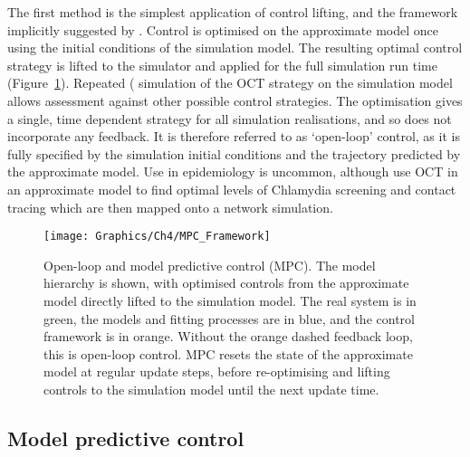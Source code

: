 The first method is the simplest application of control lifting, and the framework implicitly suggested by \citet{an_optimization_2017}. Control is optimised on the approximate model once using the initial conditions of the simulation model. The resulting optimal control strategy is lifted to the simulator and applied for the full simulation run time (Figure~\ref{fig:ch4:mpc_framework}). Repeated ( simulation of the OCT strategy on the simulation model allows assessment against other possible control strategies. The optimisation gives a single, time dependent strategy for all simulation realisations, and so does not incorporate any feedback. It is therefore referred to as `open-loop' control, as it is fully specified by the simulation initial conditions and the trajectory predicted by the approximate model. Use in epidemiology is uncommon, although \citet{clarke_approximating_2013} use OCT in an approximate model to find optimal levels of Chlamydia screening and contact tracing which are then mapped onto a network simulation.

\begin{figure}[htb]
    \begin{center}
        \texttt{[image: Graphics/Ch4/MPC\_Framework]}
        \caption{Open-loop and model predictive control (MPC). The model hierarchy is shown, with optimised controls from the approximate model directly lifted to the simulation model. The real system is in green, the models and fitting processes are in blue, and the control framework is in orange. Without the orange dashed feedback loop, this is open-loop control. MPC resets the state of the approximate model at regular update steps, before re-optimising and lifting controls to the simulation model until the next update time. }
        \label{fig:ch4:mpc_framework}
    \end{center}
\end{figure}

\subsection{Model predictive control}

